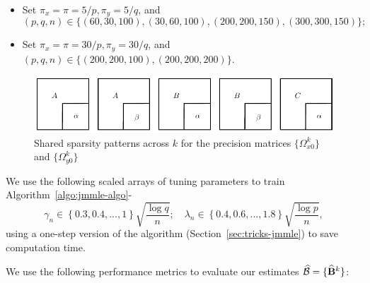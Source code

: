 \begin{itemize}
\item Set $\pi_x = \pi = 5/p, \pi_y = 5/q$, and
%
$$
(p,q,n) \in \{ (60,30,100), (30,60,100), (200,200,150), (300,300,150) \};
$$

\item Set $\pi_x = \pi = 30/p, \pi_y = 30/q$, and $(p,q,n) \in  \{ (200,200,100), (200,200,200) \}$.
\end{itemize}
%

\begin{figure}
\centering
\includegraphics{omega-structure}
\caption{Shared sparsity patterns across $k$ for the precision matrices $\{ \Omega_{x0}^k\}$ and $\{ \Omega_{y0}^k\}$}
\label{fig:sim-structure}
\end{figure}

We use the following scaled arrays of tuning parameters to train Algorithm~\ref{algo:jmmle-algo}-
%
$$
\gamma_n \in \left\{ 0.3, 0.4, ..., 1 \right\} \sqrt{\frac{\log q}{n}}; \quad
\lambda_n \in \left\{ 0.4, 0.6, ..., 1.8 \right\} \sqrt{\frac{\log p}{n}},
$$
%
using a one-step version of the algorithm (Section~\ref{sec:tricks-jmmle}) to save computation time.

We use the following performance metrics to evaluate our estimates $\widehat {{\cal{B}}} = \{ \widehat {{\mathbf{B}}}^k \}$:

